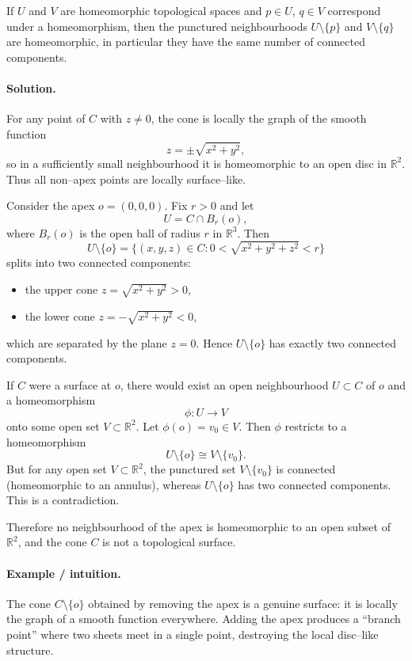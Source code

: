 \documentclass[12pt,a4paper]{article}
\theoremstyle{plain}
\theoremstyle{definition}      %
\begin{document}
If $U$ and $V$ are homeomorphic topological spaces and $p\in U$, $q\in V$ correspond under a homeomorphism, then the punctured neighbourhoods $U\setminus\{p\}$ and $V\setminus\{q\}$ are homeomorphic, in particular they have the same number of connected components.

\paragraph{Solution.}
For any point of $C$ with $z\neq 0$, the cone is locally the graph of the smooth function
\[
z=\pm\sqrt{x^2+y^2},
\]
so in a sufficiently small neighbourhood it is homeomorphic to an open disc in $\mathbb{R}^2$.  Thus all non--apex points are locally surface--like.

Consider the apex $o=(0,0,0)$.  Fix $r>0$ and let
\[
U = C\cap B_r(o),
\]
where $B_r(o)$ is the open ball of radius $r$ in $\mathbb{R}^3$.  Then
\[
U\setminus\{o\}
= \{(x,y,z)\in C : 0<\sqrt{x^2+y^2+z^2}<r\}
\]
splits into two connected components:
\begin{itemize}
	\item the upper cone $z=\sqrt{x^2+y^2}>0$,
	\item the lower cone $z=-\sqrt{x^2+y^2}<0$,
\end{itemize}
which are separated by the plane $z=0$.
Hence $U\setminus\{o\}$ has exactly two connected components.

If $C$ were a surface at $o$, there would exist an open neighbourhood
$U\subset C$ of $o$ and a homeomorphism
\[
\phi:U\longrightarrow V
\]
onto some open set $V\subset\mathbb{R}^2$.  Let $\phi(o)=v_0\in V$.
Then $\phi$ restricts to a homeomorphism
\[
U\setminus\{o\} \cong V\setminus\{v_0\}.
\]
But for any open set $V\subset\mathbb{R}^2$, the punctured set $V\setminus\{v_0\}$
is connected (homeomorphic to an annulus), whereas $U\setminus\{o\}$ has two
connected components.  This is a contradiction.

Therefore no neighbourhood of the apex is homeomorphic to an open subset
of $\mathbb{R}^2$, and the cone $C$ is not a topological surface.

\paragraph{Example / intuition.}
The cone $C\setminus\{o\}$ obtained by removing the apex is a genuine
surface: it is locally the graph of a smooth function everywhere.
Adding the apex produces a ``branch point'' where two sheets meet in a
single point, destroying the local disc--like structure.
\end{document}
